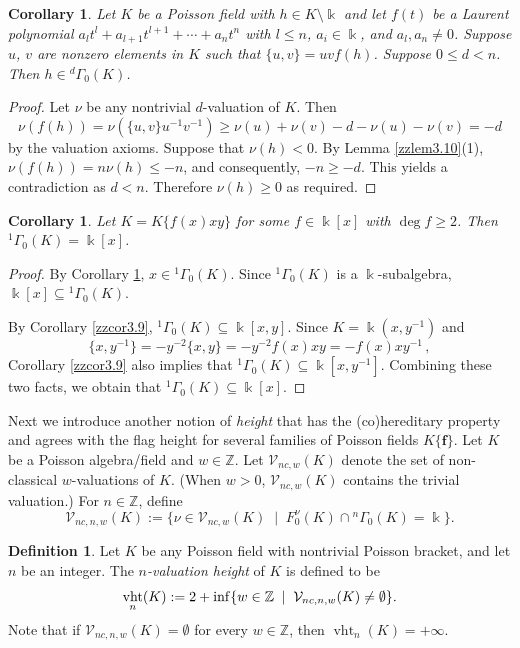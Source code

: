 \documentclass[12pt]{amsart}
\theoremstyle{plain}
\newtheorem{corollary}[theorem]{Corollary}
\numberwithin{theorem}{section}
\numberwithin{equation}{theorem}
\theoremstyle{definition}
\newtheorem{definition}[theorem]{Definition}
\newcommand{\ZZ}{\mathbb{Z}}
\DeclareMathOperator{\vht}{vht}
\newcommand \bff {{\mathbf{f}}}
\begin{document}
\begin{corollary}  
\label{zzcor3.11}
Let $K$ be a Poisson field with $h\in K\setminus \Bbbk$ 
and let $f(t)$ be a Laurent polynomial
$a_{l}t^l+a_{l+1} t^{l+1}+\cdots+ a_{n} t^n$ with 
$l\leq n$, $a_i\in \Bbbk$, and $a_{l}, a_{n}\neq 0$.
Suppose $u$, $v$ are nonzero elements in $K$ such that
$\{u,v\}=uv f(h)$. Suppose $0\leq d<n $. Then 
$h\in {^{d}\Gamma_{0}}(K)$.
\end{corollary}

\begin{proof} Let $\nu$ be any nontrivial $d$-valuation of $K$. Then 
$$\nu(f(h))=\nu(\{u,v\} u^{-1} v^{-1})
\geq \nu(u)+\nu(v)-d -\nu(u)-\nu(v) =-d$$ 
by the valuation axioms. Suppose that $\nu(h)<0$. By Lemma 
\ref{zzlem3.10}(1), $\nu(f(h))=n\nu(h)\leq -n$, and 
consequently, $-n\geq -d$. This yields a contradiction as 
$d<n$. Therefore $\nu(h)\geq 0$ as required. 
\end{proof}

\begin{corollary}  
\label{zzcor3.12}
Let $K = K\{ f(x) xy\}$ for some $f \in \Bbbk[x]$ with 
$\deg f \ge 2$. Then ${^{1}\Gamma_{0}}(K) = \Bbbk[x]$.
\end{corollary}

\begin{proof}
By Corollary \ref{zzcor3.11}, $x\in {^{1}\Gamma_{0}}(K)$. 
Since ${^{1}\Gamma_{0}}(K)$ is a $\Bbbk$-subalgebra,
$\Bbbk[x]\subseteq {^{1}\Gamma_{0}}(K)$. 

By Corollary \ref{zzcor3.9}, ${^{1}\Gamma_{0}}(K)
\subseteq \Bbbk[x,y]$. Since $K = \Bbbk(x,y^{-1})$ and 
$$\{x,y^{-1}\}= - y^{-2}\{x,y\}=
-y^{-2}f(x)xy= - f(x) x y^{-1}\,,$$
Corollary \ref{zzcor3.9} also implies that 
${^{1}\Gamma_{0}}(K) \subseteq \Bbbk[x,y^{-1}]$. Combining 
these two facts, we obtain that ${^{1}\Gamma_{0}}(K)
\subseteq \Bbbk[x]$.
\end{proof}

Next we introduce another notion 
of {\it height} that has the 
(co)hereditary property and agrees 
with the flag height for several 
families of Poisson fields $K\{\bff\}$.
Let $K$ be a Poisson algebra/field 
and $w\in {\ZZ}$. Let 
${\mathcal V}_{nc, w}(K)$ denote 
the set of non-classical $w$-valuations 
of $K$. (When $w>0$, 
${\mathcal V}_{nc, w}(K)$ contains 
the trivial valuation.)  For 
$n \in \ZZ$, define
$$
{\mathcal V}_{nc, n,w}(K)
:=\{ \nu \in {\mathcal V}_{nc, w}(K) \;\mid \;
F^{\nu}_0(K)\cap {^n\Gamma}_0(K) = \Bbbk\}.
$$

\begin{definition}
\label{zzdef3.13}
Let $K$ be any Poisson field with 
nontrivial Poisson bracket, and 
let $n$ be an integer.
The {\it $n$-valuation height}
of $K$ is defined to be
\begin{equation}
\notag
\vht_n(K):=2+ \inf\{ w \in \ZZ \; \mid \; {\mathcal V}_{nc, n,w}(K)
\neq \emptyset\}.
\end{equation}
 Note that if ${\mathcal V}_{nc,n,w}(K)= \emptyset$ for every $w \in \ZZ$, 
then $\vht_n(K)=+\infty$. 
\end{definition}
\end{document}
